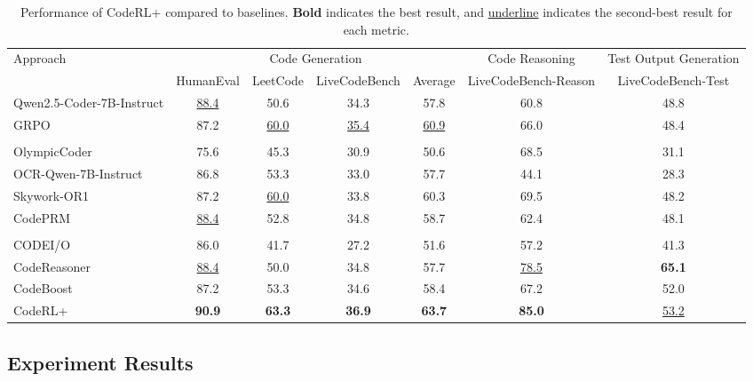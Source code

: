 \documentclass{article}
\DeclareRobustCommand{\ourapproach}{{\sc CodeRL+}\xspace}
\theoremstyle{definition}
\theoremstyle{remark}
\begin{document}
\begin{table}[t!]
\centering
\caption{Performance of \ourapproach compared to baselines. \textbf{Bold} indicates the best result, and \underline{underline} indicates the second-best result for each metric.}
\resizebox{\textwidth}{!}
{
\begin{tabular}{lcccccc}
\toprule
\multirow{2}{*}{Approach}
 & \multicolumn{4}{c}{Code Generation} & Code Reasoning & Test Output Generation \\ \cmidrule(r){2-5} \cmidrule(r){6-6} \cmidrule(r){7-7}
 & HumanEval & LeetCode & LiveCodeBench & Average & LiveCodeBench-Reason & LiveCodeBench-Test \\
\midrule
Qwen2.5-Coder-7B-Instruct & \underline{88.4} & 50.6 & 34.3 & 57.8 & 60.8 & 48.8 \\
GRPO & 87.2 & \underline{60.0} & \underline{35.4} & \underline{60.9} & 66.0 & 48.4 \\
\hdashline
\multicolumn{7}{l}{\textbf{Code Generation Baselines}}\\
OlympicCoder & 75.6 & 45.3 & 30.9 & 50.6 & 68.5 & 31.1 \\
OCR-Qwen-7B-Instruct & 86.8 & 53.3 & 33.0 & 57.7 & 44.1 & 28.3 \\
Skywork-OR1 & 87.2 & \underline{60.0} & 33.8 & 60.3 & 69.5 & 48.2  \\
CodePRM & \underline{88.4} & 52.8 & 34.8 & 58.7 & 62.4 & 48.1 \\
\hdashline
\multicolumn{7}{l}{\textbf{Code Reasoning Baselines}} \\
CODEI/O & 86.0 & 41.7 & 27.2 & 51.6 & 57.2 & 41.3 \\
CodeReasoner & \underline{88.4} & 50.0 & 34.8 & 57.7 & \underline{78.5} & \textbf{65.1} \\
CodeBoost & 87.2 & 53.3 & 34.6 & 58.4 & 67.2 & 52.0 \\
\hdashline
\ourapproach & \textbf{90.9} & \textbf{63.3} & \textbf{36.9} & \textbf{63.7} & \textbf{85.0} & \underline{53.2} \\
\bottomrule
\end{tabular}} \label{tab:main_results}
\end{table}

\subsection{Experiment Results}
\end{document}
